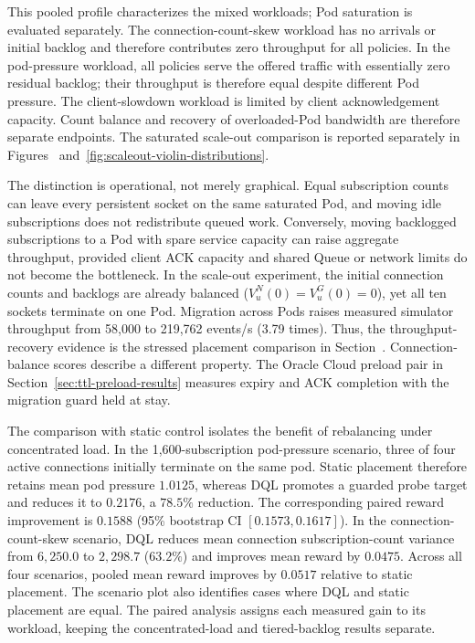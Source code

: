 This pooled profile characterizes the mixed workloads; Pod saturation is
evaluated separately. The
connection-count-skew workload has no arrivals or initial backlog and therefore
contributes zero throughput for all policies. In the pod-pressure workload,
all policies serve the offered traffic with essentially zero residual backlog;
their throughput is therefore equal despite different Pod pressure. The
client-slowdown workload is limited by client acknowledgement capacity.
Count balance and recovery of overloaded-Pod bandwidth are therefore separate
endpoints. The saturated scale-out comparison is
reported separately in Figures~
and~\ref{fig:scaleout-violin-distributions}.

The distinction is operational, not merely graphical. Equal subscription
counts can leave every persistent socket on the same saturated Pod, and moving
idle subscriptions does not redistribute queued work. Conversely, moving
backlogged subscriptions to a Pod with spare service capacity can raise
aggregate throughput, provided client ACK capacity and shared Queue or network
limits do not become the bottleneck. In the scale-out experiment, the initial
connection counts and backlogs are already balanced
($V_u^N(0)=V_u^G(0)=0$), yet all ten sockets terminate on one Pod. Migration
across Pods raises measured simulator throughput from 58,000 to 219,762 events/s
(3.79 times). Thus, the throughput-recovery evidence is the stressed placement
comparison in Section~. Connection-balance scores
describe a different property. The Oracle Cloud preload pair in
Section~\ref{sec:ttl-preload-results} measures expiry and ACK completion with
the migration guard held at stay.

The comparison with static control isolates the benefit of rebalancing under
concentrated load. In the 1,600-subscription pod-pressure scenario, three of
four active connections initially terminate on the same pod. Static placement
therefore retains mean pod pressure $1.0125$, whereas DQL promotes a guarded
probe target and reduces it to $0.2176$, a $78.5\%$ reduction. The corresponding
paired reward improvement is $0.1588$ (95\% bootstrap CI
$[0.1573,0.1617]$). In the connection-count-skew scenario, DQL reduces mean
connection subscription-count variance from $6{,}250.0$ to $2{,}298.7$
($63.2\%$) and improves mean reward by $0.0475$. Across all four scenarios,
pooled mean reward improves by $0.0517$ relative to static placement. The
scenario plot also identifies cases where DQL and static placement are equal.
The paired analysis assigns each measured gain to its workload, keeping the
concentrated-load and tiered-backlog results separate.


